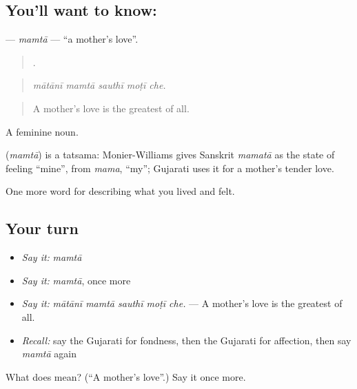 \subsection*{You'll want to know: }
\textbf{} — \emph{mamtā} — \textquotedblleft{}a mother's love\textquotedblright{}.

\begin{quote}
    .
\end{quote}

\begin{quote}
\emph{mātānī mamtā sauthī moṭī che.}
\end{quote}

\begin{quote}
A mother's love is the greatest of all.
\end{quote}

A feminine noun.

\begin{cousinweb}
\textbf{} (\emph{mamtā}) is a tatsama: Monier-Williams gives Sanskrit \emph{mamatā} as the state of feeling \textquotedblleft{}mine\textquotedblright{}, from \emph{mama}, \textquotedblleft{}my\textquotedblright{}; Gujarati uses it for a mother's tender love.
\end{cousinweb}

\begin{grammarlens}[title={What you've built}]
One more word for describing what you lived and felt.
\end{grammarlens}

\subsection*{Your turn}
\begin{itemize}
\raggedright
  \item \emph{Say it:} \emph{mamtā}
  \item \emph{Say it:} \emph{mamtā}, once more
  \item \emph{Say it:} \emph{mātānī mamtā sauthī moṭī che.} — A mother's love is the greatest of all.
  \item \emph{Recall:} say the Gujarati for fondness, then the Gujarati for affection, then say \emph{mamtā} again
\end{itemize}

\begin{tcolorbox}[breakable,colback=teal!4,colframe=teal!35!black,title={Before you move on}]
What does  mean? (\textquotedblleft{}A mother's love\textquotedblright{}.) Say it once more.
\end{tcolorbox}
